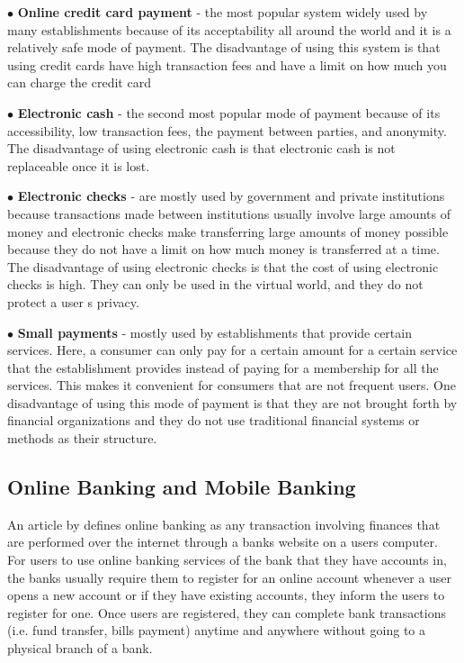 \begin{description}
   \item $\bullet$ \textbf{Online credit card payment} - the most popular system widely used by many establishments because of its acceptability all around the world and it is a relatively safe mode of payment. The disadvantage of using this system is that using credit cards have high transaction fees and have a limit on how much you can charge the credit card
   \item $\bullet$ \textbf{Electronic cash} - the second most popular mode of payment because of its accessibility, low transaction fees, the payment between parties, and anonymity. The disadvantage of using electronic cash is that electronic cash is not replaceable once it is lost.
   \item $\bullet$ \textbf{Electronic checks} - are mostly used by government and private institutions because transactions made between institutions usually involve large amounts of money and electronic checks make transferring large amounts of money possible because they do not have a limit on how much money is transferred at a time. The disadvantage of using electronic checks is that the cost of using electronic checks is high. They can only be used in the virtual world, and they do not protect a user \textsc{}s privacy.
   \item $\bullet$ \textbf{Small payments} - mostly used by establishments that provide certain services. Here, a consumer can only pay for a certain amount for a certain service that the establishment provides instead of paying for a membership for all the services. This makes it convenient for consumers that are not frequent users. One disadvantage of using this mode of payment is that they are not brought forth by financial organizations and they do not use traditional financial systems or methods as their structure. 
\end{description}

\subsection{Online Banking and Mobile Banking}
An article by  defines online banking as any transaction involving finances that are performed over the internet through a bank\textsc{}s website on a user\textsc{}s computer. For users to use online banking services of the bank that they have accounts in, the banks usually require them to register for an online account whenever a user opens a new account or if they have existing accounts, they inform the users to register for one. Once users are registered, they can complete bank transactions (i.e. fund transfer, bills payment) anytime and anywhere without going to a physical branch of a bank.
	
